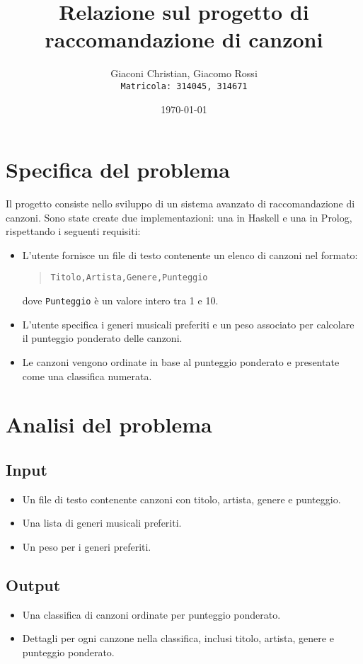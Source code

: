 \documentclass[a4paper,11pt]{article}
\title{Relazione sul progetto di raccomandazione di canzoni}
\author{Giaconi Christian, Giacomo Rossi \\\texttt{Matricola: 314045, 314671}}
\date{\today}
\begin{document}
\maketitle

\section{Specifica del problema}
Il progetto consiste nello sviluppo di un sistema avanzato di raccomandazione di canzoni. Sono state create due implementazioni: una in Haskell e una in Prolog, rispettando i seguenti requisiti:
\begin{itemize}
    \item L'utente fornisce un file di testo contenente un elenco di canzoni nel formato:
    \begin{quote}
        \texttt{Titolo,Artista,Genere,Punteggio}
    \end{quote}
    dove \texttt{Punteggio} è un valore intero tra 1 e 10.
    \item L'utente specifica i generi musicali preferiti e un peso associato per calcolare il punteggio ponderato delle canzoni.
    \item Le canzoni vengono ordinate in base al punteggio ponderato e presentate come una classifica numerata.
\end{itemize}

\section{Analisi del problema}
\subsection{Input}
\begin{itemize}
    \item Un file di testo contenente canzoni con titolo, artista, genere e punteggio.
    \item Una lista di generi musicali preferiti.
    \item Un peso per i generi preferiti.
\end{itemize}

\subsection{Output}
\begin{itemize}
    \item Una classifica di canzoni ordinate per punteggio ponderato.
    \item Dettagli per ogni canzone nella classifica, inclusi titolo, artista, genere e punteggio ponderato.
\end{itemize}
\end{document}
